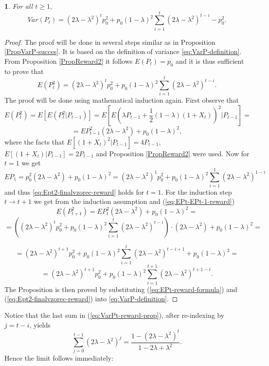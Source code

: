 \documentclass{amsart}
\theoremstyle{definition}
\theoremstyle{plain}
\newtheorem{prop}[thm]{\protect\propositionname}
\theoremstyle{plain}
\theoremstyle{plain}
\numberwithin{equation}{section}
\providecommand{\propositionname}{Proposition}
\begin{document}
\begin{prop}
For all $t\geq1,$
\begin{equation}
Var(P_{t})=(2\lambda-\lambda^{2})^{t}p_{0}^{2}+p_{0}(1-\lambda)^{2}\sum_{i=1}^{t}(2\lambda-\lambda^{2})^{t-i}-p_{0}^{2}.\label{eq:VarPt-reward-prop}
\end{equation}
\end{prop}
\begin{proof}
The proof will be done in several steps similar as in Proposition
\ref{PropVarP-succes}. It is based on the definition of variance \eqref{eq:VarP-definition}. From Proposition \ref{PropReward2} it follows $E(P_{t})=p_{0}$ and
it is thus sufficient to prove that
\begin{equation}
E(P_{t}^{2})=(2\lambda-\lambda^{2})^{t}p_{0}^{2}+p_{0}(1-\lambda)^{2}\sum_{i=1}^{t}(2\lambda-\lambda^{2})^{t-i}.\label{eq:Ept2-finalvzorec-reward}
\end{equation}
The proof will be done using mathematical induction again. First observe that
\[
E(P_{t}^{2})=E[E(P_{t}^{2}|P_{t-1})]=E[E(\lambda P_{t-1}+\frac{1}{2}(1-\lambda)(1+X_{t}))^{2}|P_{t-1}]=
\]
\begin{equation}
=EP_{t-1}^{2}(2\lambda-\lambda^{2})+p_{0}(1-\lambda)^{2},\label{eq:EPt-EPt-1-reward}
\end{equation}
where the facts that $E[(1+X_{t})^{2}|P_{t-1}]=4P_{t-1}$, $E[(1+X_{t})|P_{t-1}]=2P_{t-1}$
and Proposition \ref{PropReward2} were used. Now for $t=1$ we get
\[
EP_{1}=p_{0}^{2}(2\lambda-\lambda^{2})+p_{0}(1-\lambda)^{2}=(2\lambda-\lambda^{2})^{1}p_{0}^{2}+p_{0}(1-\lambda)^{2}\sum_{i=1}^{1}(2\lambda-\lambda^{2})^{1-i}
\]
and thus \eqref{eq:Ept2-finalvzorec-reward} holds for $t=1$. For the induction step $t\rightarrow t+1$
we get from the induction assumption and (\ref{eq:EPt-EPt-1-reward})
\[
E(P_{t+1}^{2})=EP_{t}^{2}(2\lambda-\lambda^{2})+p_{0}(1-\lambda)^{2}=
\]
\[
=((2\lambda-\lambda^{2})^{t}p_{0}^{2}+p_{0}(1-\lambda)^{2}\sum_{i=1}^{t}(2\lambda-\lambda^{2})^{t-i})\cdot(2\lambda-\lambda^{2})+p_{0}(1-\lambda)^{2}=
\]

\[
=(2\lambda-\lambda^{2})^{t+1}p_{0}^{2}+p_{0}(1-\lambda)^{2}\sum_{i=1}^{t}(2\lambda-\lambda^{2})^{t-i+1}+p_{0}(1-\lambda)^{2}=
\]
\[
=(2\lambda-\lambda^{2})^{t+1}p_{0}^{2}+p_{0}(1-\lambda)^{2}\sum_{i=1}^{t+1}(2\lambda-\lambda^{2})^{t+1-i}.
\]
The Proposition is then proved by substituting (\ref{eq:EPt-reward-formula})
and (\ref{eq:Ept2-finalvzorec-reward}) into \eqref{eq:VarP-definition}.
\end{proof}
Notice that the last sum in (\ref{eq:VarPt-reward-prop}), after re-indexing
by $j=t-i$, yields 
\[
\sum_{j=0}^{t-1}(2\lambda-\lambda^{2})^{j}=\frac{1-(2\lambda-\lambda^{2})^{t}}{1-2\lambda+\lambda^{2}}.
\]
Hence the limit follows immediately:
\end{document}
